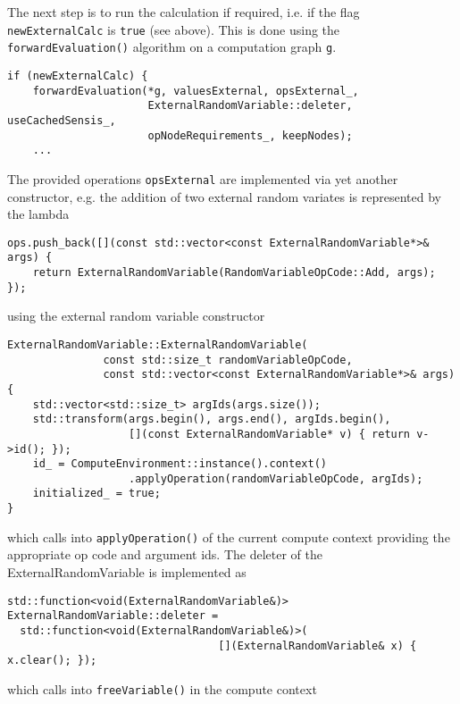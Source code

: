 \documentclass[12pt, a4paper]{article}
\begin{document}
The next step is to run the calculation if required, i.e. if the flag \verb+newExternalCalc+ is \verb+true+ (see
above). This is done using the \verb+forwardEvaluation()+ algorithm on a computation graph \verb+g+.

\begin{verbatim}
if (newExternalCalc) {
    forwardEvaluation(*g, valuesExternal, opsExternal_,
                      ExternalRandomVariable::deleter, useCachedSensis_,
                      opNodeRequirements_, keepNodes);
    ...
\end{verbatim}

The provided operations \verb+opsExternal+ are implemented via yet another constructor, e.g. the addition of two
external random variates is represented by the lambda

\begin{verbatim}
ops.push_back([](const std::vector<const ExternalRandomVariable*>& args) {
    return ExternalRandomVariable(RandomVariableOpCode::Add, args);
});
\end{verbatim}

using the external random variable constructor

\begin{verbatim}
ExternalRandomVariable::ExternalRandomVariable(
               const std::size_t randomVariableOpCode,
               const std::vector<const ExternalRandomVariable*>& args) {
    std::vector<std::size_t> argIds(args.size());
    std::transform(args.begin(), args.end(), argIds.begin(),
                   [](const ExternalRandomVariable* v) { return v->id(); });
    id_ = ComputeEnvironment::instance().context()
                   .applyOperation(randomVariableOpCode, argIds);
    initialized_ = true;
}
\end{verbatim}

which calls into \verb+applyOperation()+ of the current compute context providing the appropriate op code and argument
ids. The deleter of the ExternalRandomVariable is implemented as

\begin{verbatim}
std::function<void(ExternalRandomVariable&)> ExternalRandomVariable::deleter =
  std::function<void(ExternalRandomVariable&)>(
                                 [](ExternalRandomVariable& x) { x.clear(); });
\end{verbatim}

which calls into \verb+freeVariable()+ in the compute context
\end{document}
